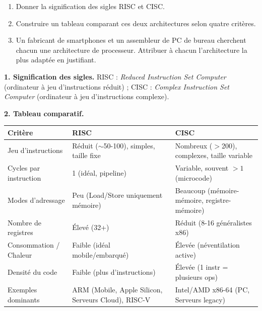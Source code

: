\documentclass[11pt]{article}
\begin{document}
\begin{exoresolu}
\begin{enumerate}
\item Donner la signification des sigles RISC et CISC.
\item Construire un tableau comparant ces deux architectures selon quatre critères.
\item Un fabricant de smartphones et un assembleur de PC de bureau cherchent chacun une architecture de processeur. Attribuer à chacun l'architecture la plus adaptée en justifiant.
\end{enumerate}
\tcblower
\textbf{1. Signification des sigles.} RISC : \emph{Reduced Instruction Set Computer} (ordinateur à jeu d'instructions réduit) ; CISC : \emph{Complex Instruction Set Computer} (ordinateur à jeu d'instructions complexe).

\textbf{2. Tableau comparatif.}
\begin{center}
\begin{tabularx}{\linewidth}{|l|X|X|}
\hline
\rowcolor{popblueL} \textbf{Critère} & \textbf{RISC} & \textbf{CISC} \\
\hline
Jeu d'instructions & Réduit ($\sim$50-100), simples, taille fixe & Nombreux ($>$200), complexes, taille variable \\
\hline
Cycles par instruction & 1 (idéal, pipeline) & Variable, souvent $>1$ (microcode) \\
\hline
Modes d'adressage & Peu (Load/Store uniquement mémoire) & Beaucoup (mémoire-mémoire, registre-mémoire) \\
\hline
Nombre de registres & Élevé (32+) & Réduit (8-16 généralistes x86) \\
\hline
Consommation / Chaleur & Faible (idéal mobile/embarqué) & Élevée (néventilation active) \\
\hline
Densité du code & Faible (plus d'instructions) & Élevée (1 instr = plusieurs ops) \\
\hline
Exemples dominants & ARM (Mobile, Apple Silicon, Serveurs Cloud), RISC-V & Intel/AMD x86-64 (PC, Serveurs legacy) \\
\hline
\end{tabularx}
\end{center}


\end{exoresolu}
\end{document}
